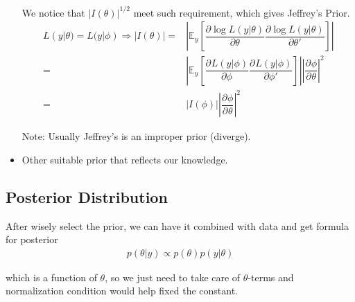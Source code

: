 \begin{itemize}[topsep=2pt,itemsep=0pt]
    We notice that $ |I(\theta) |^{1/2} $ meet such requirement, which gives Jeffrey's Prior.
    \begin{align*}
        L(y|\theta )=L(y|\phi ) \Rightarrow  |I(\theta )|=&\left\vert\mathbb{E}_y\left[ \dfrac{\partial \log L(y|\theta ) }{\partial \theta  } \dfrac{\partial \log L(y|\theta ) }{\partial \theta'  } \right] \right\vert\\
        =&\left\vert\mathbb{E}_y\left[ \dfrac{\partial^{}L(y|\phi )  }{\partial \phi  ^{} }\dfrac{\partial^{}L(y|\phi )  }{\partial \phi' } \right]\right\vert \left| \dfrac{\partial^{} \phi }{\partial ^{} \theta } \right|^2\\
        =&|I(\phi )|\left| \dfrac{\partial^{} \phi }{\partial ^{} \theta } \right|^2
    \end{align*}

    Note: Usually Jeffrey's is an improper prior (diverge).
    
    \item Other suitable prior that reflects our knowledge.
    
     
\end{itemize}


\subsection{Posterior Distribution}
After wisely select the prior, we can have it combined with data and get formula for posterior
\begin{align*}
    p(\theta |y)\propto p(\theta )p(y|\theta ) 
\end{align*}

which is a function of $ \theta  $, so we just need to take care of $ \theta  $-terms and normalization condition would help fixed the constant.

